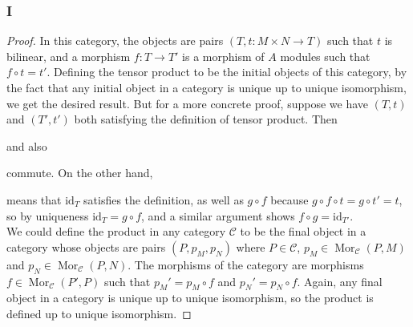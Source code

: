 \documentclass{article}
\newcommand{\id}{\mathrm{id}}
\newcommand{\fC}{\mathscr{C}}
\DeclareMathOperator{\Mor}{Mor}
\begin{document}
\subsubsection{I}\label{1.3.I}
\begin{proof}
    In this category, the objects are pairs $(T,t:M\times N\to T)$ such that $t$ is bilinear, and a morphism $f:T\to T'$ is a morphism of $A$ modules such that $f\circ t=t'$. Defining the tensor product to be the initial objects of this category, by the fact that any initial object in a category is unique up to unique isomorphism, we get the desired result. But for a more concrete proof, suppose we have $(T,t)$ and $(T',t')$ both satisfying the definition of tensor product. Then
    \begin{center}
    \end{center}
    and also
    \begin{center}
    \end{center}
    commute. On the other hand,
    \begin{center}
    \end{center}
    means that $\id_T$ satisfies the definition, as well as $g\circ f$ because $g\circ f\circ t=g\circ t'=t$, so by uniqueness $\id_T=g\circ f$, and a similar argument shows $f\circ g=\id_{T'}$.\\
    \newline
    We could define the product in any category $\fC$ to be the final object in a category whose objects are pairs $(P,p_M,p_N)$ where $P\in \fC$, $p_M\in \Mor_\fC(P,M)$ and $p_N\in \Mor_\fC(P,N)$. The morphisms of the category are morphisms $f\in \Mor_\fC(P',P)$ such that $p_M'=p_M\circ f$ and $p_N'=p_N\circ f$. Again, any final object in a category is unique up to unique isomorphism, so the product is defined up to unique isomorphism.
\end{proof}
\end{document}
